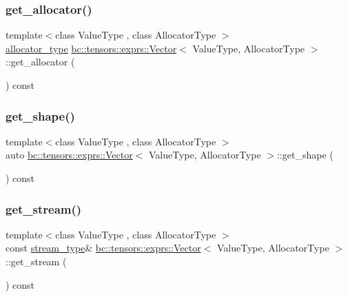 \subsubsection{\texorpdfstring{get\+\_\+allocator()}{get\_allocator()}}
{\footnotesize\ttfamily template$<$class Value\+Type , class Allocator\+Type $>$ \\
\hyperlink{structbc_1_1tensors_1_1exprs_1_1Vector_a94fd93f892cde60396b78ab67b180a19}{allocator\+\_\+type} \hyperlink{structbc_1_1tensors_1_1exprs_1_1Vector}{bc\+::tensors\+::exprs\+::\+Vector}$<$ Value\+Type, Allocator\+Type $>$\+::get\+\_\+allocator (\begin{DoxyParamCaption}{ }\end{DoxyParamCaption}) const\hspace{0.3cm}{\ttfamily [inline]}}

\mbox{\label{structbc_1_1tensors_1_1exprs_1_1Vector_af37170466c5c1d7e33ff4d09e0dc7c2d}} 
\subsubsection{\texorpdfstring{get\+\_\+shape()}{get\_shape()}}
{\footnotesize\ttfamily template$<$class Value\+Type , class Allocator\+Type $>$ \\
auto \hyperlink{structbc_1_1tensors_1_1exprs_1_1Vector}{bc\+::tensors\+::exprs\+::\+Vector}$<$ Value\+Type, Allocator\+Type $>$\+::get\+\_\+shape (\begin{DoxyParamCaption}{ }\end{DoxyParamCaption}) const\hspace{0.3cm}{\ttfamily [inline]}}

\mbox{\label{structbc_1_1tensors_1_1exprs_1_1Vector_a1efa78ba3b993bdbdbae6b0c35ad82b3}} 
\subsubsection{\texorpdfstring{get\+\_\+stream()}{get\_stream()}\hspace{0.1cm}{\footnotesize\ttfamily [1/2]}}
{\footnotesize\ttfamily template$<$class Value\+Type , class Allocator\+Type $>$ \\
const \hyperlink{structbc_1_1tensors_1_1exprs_1_1Vector_a6a9edbbd7f8743e3a303e64ac887e498}{stream\+\_\+type}\& \hyperlink{structbc_1_1tensors_1_1exprs_1_1Vector}{bc\+::tensors\+::exprs\+::\+Vector}$<$ Value\+Type, Allocator\+Type $>$\+::get\+\_\+stream (\begin{DoxyParamCaption}{ }\end{DoxyParamCaption}) const\hspace{0.3cm}{\ttfamily [inline]}}

